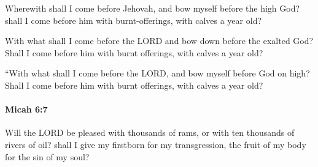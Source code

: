 			\begin{versebox}
					\item[BHS] 
					\item[LXX] 
					\item[ASV] Wherewith shall I come before Jehovah, and bow myself before the high God? shall I come before him with burnt-offerings, with calves a year old?
					\item[NIV] With what shall I come before the LORD and bow down before the exalted God? Shall I come before him with burnt offerings, with calves a year old?
					\item[NRSV] “With what shall I come before the LORD, and bow myself before God on high? Shall I come before him with burnt offerings, with calves a year old?
			\end{versebox}

		\paragraph{Micah 6:7} %
			\label{MICAH-6-7}

			Will the LORD be pleased with thousands of rams, or with ten thousands of rivers of oil? shall I give my firstborn for my transgression, the fruit of my body for the sin of my soul?

